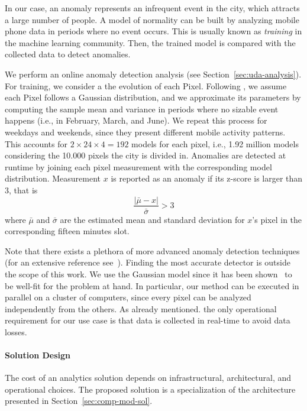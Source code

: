 {In our case, an anomaly represents an infrequent event in the city, which attracts a large number of people. A model of normality can be built by analyzing mobile phone data in periods where no event occurs. This is usually known as \textit{training} in the machine learning community. Then, the trained model is compared with the collected data to detect anomalies.

We perform an online anomaly detection analysis (see Section~\ref{sec:uda-analysis}). 
For training, we consider a the evolution of each \textsf{Pixel}. 
Following \cite{DBLP:journals/ieeemm/BalduiniVALAC15}, we assume each \textsf{Pixel} follows a Gaussian distribution, and we approximate its parameters by computing the sample mean and variance in periods where no sizable event happens (i.e., in February, March, and June). We repeat this process for weekdays and weekends, since they present different mobile activity patterns. This accounts for $2 \times 24 \times 4 = 192$ models for each pixel, i.e., 1.92 million models considering the 10.000 pixels the city is divided in. Anomalies are detected at runtime by joining each pixel measurement with the corresponding model distribution. Measurement $x$ is reported as an anomaly if its z-score is larger than $3$, that is 
\begin{equation}
\label{eq:zscore}
  \frac{|\bar{\mu} - x|}{\bar{\sigma}} > 3
\end{equation}
where $\bar{\mu}$ and $\bar{\sigma}$ are the estimated mean and standard deviation for $x$'s pixel in the corresponding fifteen minutes slot.

Note that there exists a plethora of more advanced anomaly detection techniques (for an extensive reference see~\cite{aggarwal2015outlier}). Finding the most accurate detector is outside the scope of this work. We use the Gaussian model since it has been shown~\cite{DBLP:journals/ieeemm/BalduiniVALAC15} to be well-fit for the problem at hand. In particular, our method can be executed in parallel on a cluster of computers, since every pixel can be analyzed independently from the others. As already mentioned. the only operational requirement for our use case is that data is collected in real-time to avoid data losses.

\paragraph{Solution Design} \label{sec:solutions}
The cost of an analytics solution depends on infrastructural, architectural, and operational choices. The proposed solution is a specialization of the architecture presented in Section~\ref{sec:comp-mod-sol}.

}
